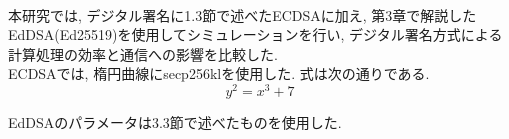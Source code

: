 \\
\indent 本研究では, デジタル署名に1.3節で述べたECDSAに加え, 
第3章で解説したEdDSA(Ed25519)を使用してシミュレーションを行い, 
デジタル署名方式による計算処理の効率と通信への影響を比較した. \\ 
\indent ECDSAでは, 楕円曲線にsecp256klを使用した. 式は次の通りである. 
\[
  y^2 = x^3 + 7 
\]


\indent EdDSAのパラメータは3.3節で述べたものを使用した.




